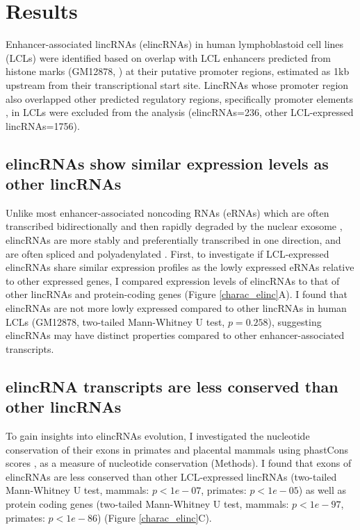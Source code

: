 \documentclass[11pt,a4paper]{report}
\begin{document}
\section*{Results}

Enhancer-associated lincRNAs (elincRNAs) in human lymphoblastoid cell lines (LCLs) were identified based on overlap with LCL enhancers predicted from histone marks (GM12878, \cite{ENCODEProject2012}⁠) at their putative promoter regions, estimated as 1kb upstream from their transcriptional start site. LincRNAs whose promoter region also overlapped other predicted regulatory regions, specifically promoter elements \cite{ENCODEProject2012}⁠, in LCLs were excluded from the analysis (elincRNAs=236, other LCL-expressed lincRNAs=1756).

\subsection*{elincRNAs show similar expression levels as other lincRNAs}

Unlike most enhancer-associated noncoding RNAs (eRNAs) which are often transcribed bidirectionally and then rapidly degraded by the nuclear exosome \cite{Darrow2013} \cite{Lam2014}⁠, elincRNAs are more stably and preferentially transcribed in one direction, and are often spliced and polyadenylated \cite{Marques2013a}⁠. 
First, to investigate if LCL-expressed elincRNAs share similar expression profiles as the lowly expressed eRNAs relative to other expressed genes, I compared  expression levels of elincRNAs to that of other lincRNAs and protein-coding genes (Figure \ref{charac_elinc}A). I found that elincRNAs are not more lowly expressed compared to other lincRNAs in human LCLs (GM12878, two-tailed Mann-Whitney U test, $p=0.258$), suggesting elincRNAs may have distinct properties compared to other enhancer-associated transcripts.

\subsection*{elincRNA transcripts are less conserved than other lincRNAs}

To gain insights into elincRNAs evolution, I investigated the nucleotide conservation of their exons in primates and placental mammals using phastCons scores \cite{Siepel2005}⁠, as a measure of nucleotide conservation (Methods). I found that exons of elincRNAs are less conserved than other LCL-expressed lincRNAs (two-tailed Mann-Whitney U test, mammals: $p<1e-07$, primates: $p<1e-05$) as well as  protein coding genes (two-tailed Mann-Whitney U test, mammals: $p<1e-97$, primates: $p<1e-86$) (Figure \ref{charac_elinc}C). 
\end{document}
